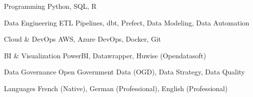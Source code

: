 

\begin{cvskills}

  \cvskill
    {Programming} %
    {Python, SQL, R} %

  \cvskill
    {Data Engineering} %
    {ETL Pipelines, dbt, Prefect, Data Modeling, Data Automation} %

  \cvskill
    {Cloud \& DevOps} %
    {AWS, Azure DevOps, Docker, Git} %

  \cvskill
    {BI \& Visualization} %
    {PowerBI, Datawrapper, Huwise (Opendatasoft)} %

  \cvskill
    {Data Governance} %
    {Open Government Data (OGD), Data Strategy, Data Quality} %

  \cvskill
    {Languages} %
    {French (Native), German (Professional), English (Professional)} %

\end{cvskills}
